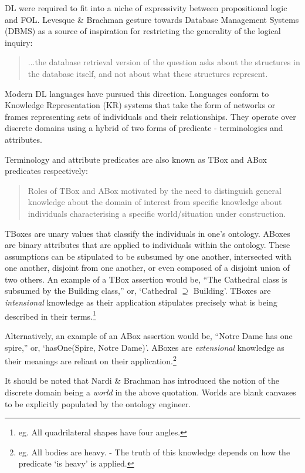 \documentclass[titlepage,a4paper,12pt,oneside]{book}
\begin{document}
DL were required to fit into a niche of expressivity between propositional logic and FOL.
Levesque \& Brachman gesture towards Database Management Systems (DBMS) as a source of inspiration for restricting the generality of the logical inquiry: 
\begin{quote}
  ...the database retrieval version of the question asks about the structures in the database itself, and not about what these structures represent. \cite[82]{expressiveness1987}
\end{quote}
Modern DL languages have pursued this direction.
Languages conform to Knowledge Representation (KR) systems that take the form of networks or frames representing sets of individuals and their relationships.
They operate over discrete domains using a hybrid of two forms of predicate - terminologies and attributes.\par
Terminology and attribute predicates are also known as TBox and ABox predicates respectively:
\begin{quote}
  Roles of TBox and ABox motivated by the need to distinguish general knowledge about the domain of interest from specific knowledge about individuals characterising a specific world/situation under construction. \cite[27]{handbookIntro2003}
\end{quote}
TBoxes are unary values that classify the individuals in one's ontology.
ABoxes are binary attributes that are applied to individuals within the ontology.
These assumptions can be stipulated to be subsumed by one another, intersected with one another, disjoint from one another, or even composed of a disjoint union of two others.
An example of a TBox assertion would be, ``The Cathedral class is subsumed by the Building class,'' or, `Cathedral \(\supseteq\) Building'.
TBoxes are \textit{intensional} knowledge as their application stipulates precisely what is being described in their terms.\footnote{eg. All quadrilateral shapes have four angles.}\par   
Alternatively, an example of an ABox assertion would be, ``Notre Dame has one spire,'' or, `hasOne(Spire, Notre Dame)'.
ABoxes are \textit{extensional} knowledge as their meanings are reliant on their application.\footnote{eg. All bodies are heavy. - The truth of this knowledge depends on how the predicate `is heavy' is applied.}\par
It should be noted that Nardi \& Brachman has introduced the notion of the discrete domain being a \textit{world} in the above quotation.
Worlds are blank canvases to be explicitly populated by the ontology engineer.
\end{document}
